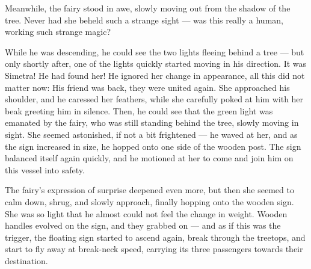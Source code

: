 Meanwhile, the fairy stood in awe, slowly moving out from the shadow of the tree. Never had she beheld such a strange sight --- was this really a human, working such strange magic?

\froufrou{}

While he was descending, he could see the two lights fleeing behind a tree --- but only shortly after, one of the lights quickly started moving in his direction. It was Simetra! He had found her! 
He ignored her change in appearance, all this did not matter now: His friend was back, they were united again. She approached his shoulder, and he caressed her feathers, while she carefully poked at him with her beak greeting him in silence. Then, he could see that the green light was emanated by the fairy, who was still standing behind the tree, slowly moving in sight. She seemed astonished, if not a bit frightened --- he waved at her, and as the sign increased in size, he hopped onto one side of the wooden post. The sign balanced itself again quickly, and he motioned at her to come and join him on this vessel into safety.

The fairy's expression of surprise deepened even more, but then she seemed to calm down, shrug, and slowly approach, finally hopping onto the wooden sign. She was so light that he almost could not feel the change in weight. Wooden handles evolved on the sign, and they grabbed on --- and as if this was the trigger, the floating sign started to ascend again, break through the treetops, and start to fly away at break-neck speed, carrying its three passengers towards their destination.
